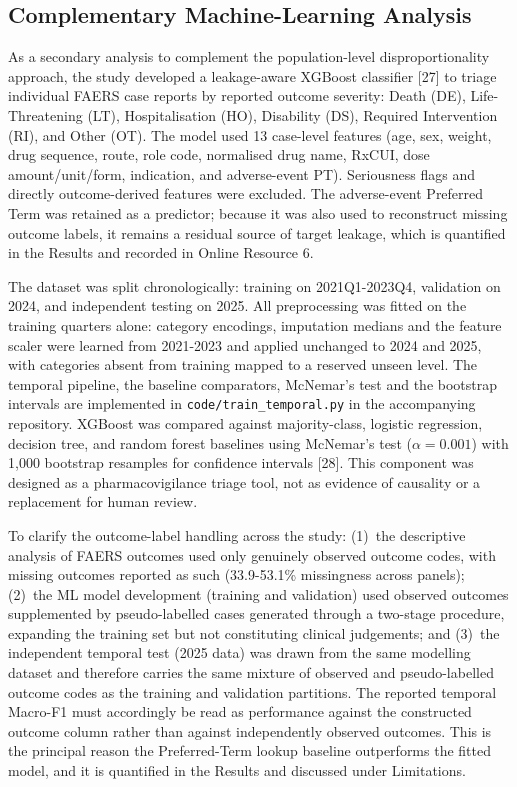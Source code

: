 \documentclass[10pt,a4paper]{article}
\begin{document}
\subsection{Complementary Machine-Learning Analysis}
As a secondary analysis to complement the population-level disproportionality approach, the study developed a leakage-aware XGBoost classifier [27] to triage individual FAERS case reports by reported outcome severity: Death (DE), Life-Threatening (LT), Hospitalisation (HO), Disability (DS), Required Intervention (RI), and Other (OT). The model used 13 case-level features (age, sex, weight, drug sequence, route, role code, normalised drug name, RxCUI, dose amount/unit/form, indication, and adverse-event PT). Seriousness flags and directly outcome-derived features were excluded. The adverse-event Preferred Term was retained as a predictor; because it was also used to reconstruct missing outcome labels, it remains a residual source of target leakage, which is quantified in the Results and recorded in Online Resource 6.

The dataset was split chronologically: training on 2021Q1-2023Q4, validation on 2024, and independent testing on 2025. All preprocessing was fitted on the training quarters alone: category encodings, imputation medians and the feature scaler were learned from 2021-2023 and applied unchanged to 2024 and 2025, with categories absent from training mapped to a reserved unseen level. The temporal pipeline, the baseline comparators, McNemar's test and the bootstrap intervals are implemented in \texttt{code/train\_temporal.py} in the accompanying repository. XGBoost was compared against majority-class, logistic regression, decision tree, and random forest baselines using McNemar's test ($\alpha = 0.001$) with 1{,}000 bootstrap resamples for confidence intervals [28]. This component was designed as a pharmacovigilance triage tool, not as evidence of causality or a replacement for human review.

To clarify the outcome-label handling across the study: (1)~the descriptive analysis of FAERS outcomes used only genuinely observed outcome codes, with missing outcomes reported as such (33.9-53.1\% missingness across panels); (2)~the ML model development (training and validation) used observed outcomes supplemented by pseudo-labelled cases generated through a two-stage procedure, expanding the training set but not constituting clinical judgements; and (3)~the independent temporal test (2025 data) was drawn from the same modelling dataset and therefore carries the same mixture of observed and pseudo-labelled outcome codes as the training and validation partitions. The reported temporal Macro-F1 must accordingly be read as performance against the constructed outcome column rather than against independently observed outcomes. This is the principal reason the Preferred-Term lookup baseline outperforms the fitted model, and it is quantified in the Results and discussed under Limitations.
\end{document}
